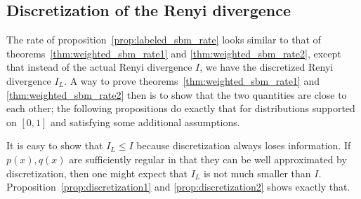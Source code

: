 \subsection{Discretization of the Renyi divergence}
\label{sec:discretization_analysis}

The rate of proposition~\ref{prop:labeled_sbm_rate} looks similar to that of theorems~\ref{thm:weighted_sbm_rate1} and \ref{thm:weighted_sbm_rate2}, except that instead of the actual Renyi divergence $I$, we have the discretized Renyi divergence $I_L$. A way to prove theorems~\ref{thm:weighted_sbm_rate1} and \ref{thm:weighted_sbm_rate2} then is to show that the two quantities are close to each other; the following propositions do exactly that for distributions supported on $[0,1]$ and satisfying some additional assumptions. 

It is easy to show that $I_L \leq I$ because discretization always loses information. If $p(x), q(x)$ are sufficiently regular in that they can be well approximated by discretization, then one might expect that $I_L$ is not much smaller than $I$. Proposition~\ref{prop:discretization1} and \ref{prop:discretization2} shows exactly that. 

